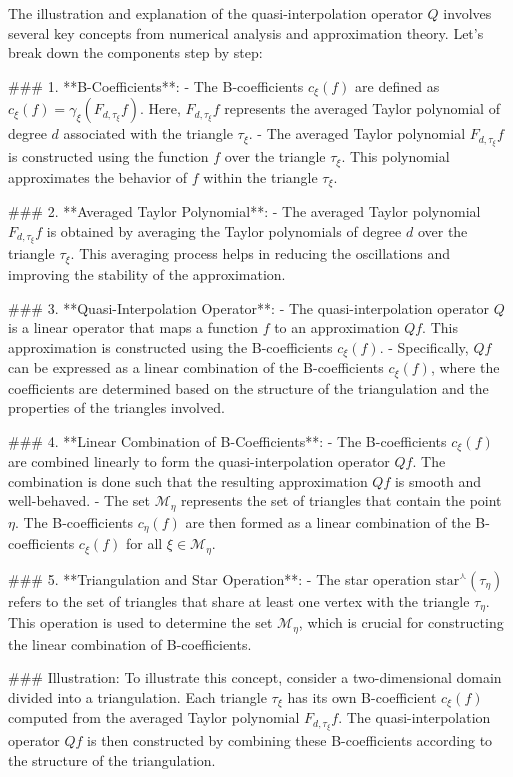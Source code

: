 The illustration and explanation of the quasi-interpolation operator \( Q \) involves several key concepts from numerical analysis and approximation theory. Let's break down the components step by step:

### 1. **B-Coefficients**:
   - The B-coefficients \( c_\xi(f) \) are defined as \( c_\xi(f) = \gamma_\xi(F_{d,\tau_\xi} f) \). Here, \( F_{d,\tau_\xi} f \) represents the averaged Taylor polynomial of degree \( d \) associated with the triangle \( \tau_\xi \).
   - The averaged Taylor polynomial \( F_{d,\tau_\xi} f \) is constructed using the function \( f \) over the triangle \( \tau_\xi \). This polynomial approximates the behavior of \( f \) within the triangle \( \tau_\xi \).

### 2. **Averaged Taylor Polynomial**:
   - The averaged Taylor polynomial \( F_{d,\tau_\xi} f \) is obtained by averaging the Taylor polynomials of degree \( d \) over the triangle \( \tau_\xi \). This averaging process helps in reducing the oscillations and improving the stability of the approximation.

### 3. **Quasi-Interpolation Operator**:
   - The quasi-interpolation operator \( Q \) is a linear operator that maps a function \( f \) to an approximation \( Qf \). This approximation is constructed using the B-coefficients \( c_\xi(f) \).
   - Specifically, \( Qf \) can be expressed as a linear combination of the B-coefficients \( c_\xi(f) \), where the coefficients are determined based on the structure of the triangulation and the properties of the triangles involved.

### 4. **Linear Combination of B-Coefficients**:
   - The B-coefficients \( c_\xi(f) \) are combined linearly to form the quasi-interpolation operator \( Qf \). The combination is done such that the resulting approximation \( Qf \) is smooth and well-behaved.
   - The set \( \mathcal{M}_\eta \) represents the set of triangles that contain the point \( \eta \). The B-coefficients \( c_\eta(f) \) are then formed as a linear combination of the B-coefficients \( c_\xi(f) \) for all \( \xi \in \mathcal{M}_\eta \).

### 5. **Triangulation and Star Operation**:
   - The star operation \( \text{star}^\curlywedge(\tau_\eta) \) refers to the set of triangles that share at least one vertex with the triangle \( \tau_\eta \). This operation is used to determine the set \( \mathcal{M}_\eta \), which is crucial for constructing the linear combination of B-coefficients.

### Illustration:
To illustrate this concept, consider a two-dimensional domain divided into a triangulation. Each triangle \( \tau_\xi \) has its own B-coefficient \( c_\xi(f) \) computed from the averaged Taylor polynomial \( F_{d,\tau_\xi} f \). The quasi-interpolation operator \( Qf \) is then constructed by combining these B-coefficients according to the structure of the triangulation.


